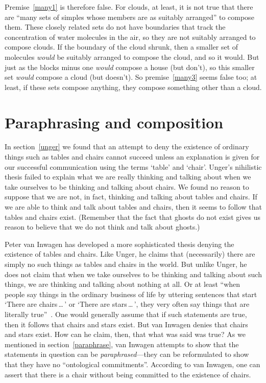 \documentclass[11pt]{article}
\begin{document}
\begin{spacing}{1.5}
Premise~\ref{many1} is therefore false.  For clouds, at least, it is
not true that there are ``many sets of simples whose members are as
suitably arranged'' to compose them.  These closely related sets do
not have boundaries that track the concentration of water molecules in
the air, so they are not suitably arranged to compose clouds.  If the
boundary of the cloud shrunk, then a smaller set of molecules {\em
  would} be suitably arranged to compose the cloud, and so it would.
But just as the blocks minus one {\em would} compose a house (but
don't), so this smaller set {\em would} compose a cloud (but doesn't).
So premise~\ref{many3} seems false too; at least, if these sets
compose anything, they compose something other than a cloud.

\section{Paraphrasing and composition}
In section~\ref{unger} we found that an attempt to deny the existence
of ordinary things such as tables and chairs cannot succeed unless an
explanation is given for our successful communication using the terms
`table' and `chair'.  Unger's nihilistic thesis failed to explain what
we are really thinking and talking about when we take ourselves to be
thinking and talking about chairs.  We found no reason to suppose that
we are not, in fact, thinking and talking about tables and chairs.  If
we are able to think and talk about tables and chairs, then it seems
to follow that tables and chairs exist.  (Remember that the fact that
ghosts do not exist gives us reason to believe that we do not think
and talk about ghosts.)

Peter van Inwagen has developed a more sophisticated thesis denying
the existence of tables and chairs.  Like Unger, he claims that
(necessarily) there are simply no such things as tables and chairs in
the world.  But unlike Unger, he does not claim that when we take
ourselves to be thinking and talking about such things, we are
thinking and talking about nothing at all.  Or at least ``when people
say things in the ordinary business of life by uttering sentences that
start `There are chairs\,\ldots\,' or `There are stars\,\ldots\,',
they very often say things that are literally
true''~\citep[102]{inwagen1995}.  One would generally assume that if
such statements are true, then it follows that chairs and stars exist.
But van Inwagen denies that chairs and stars exist.  How can he claim,
then, that what was said was true?  As we mentioned in
section~\ref{paraphrase}, van Inwagen attempts to show that the
statements in question can be {\em paraphrased}---they can be
reformulated to show that they have no ``ontological commitments''.
According to van Inwagen, one can assert that there is a chair without
being committed to the existence of chairs.


\end{spacing}
\end{document}
